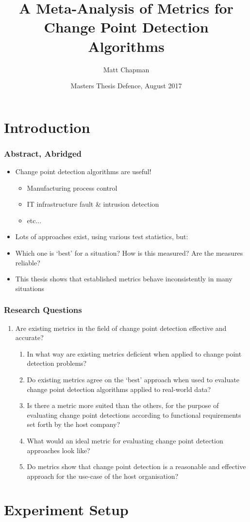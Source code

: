 \documentclass{beamer}
\title[Metrics Meta-Analysis]{A Meta-Analysis of Metrics for Change Point Detection Algorithms}
\author{Matt Chapman}
\institute[UVA]{Universiteit van Amsterdam\\%
    Master Software Engineering%
}
\date[August 2017]{Masters Thesis Defence, August 2017}
\begin{document}
    
\frame{\titlepage}


\section{Introduction}

\begin{frame}
    \frametitle{Abstract, Abridged}
    \begin{itemize}
        \item Change point detection algorithms are useful!
        \begin{itemize}
            \item Manufacturing process control
            \item IT infrastructure fault \& intrusion detection
            \item etc...
        \end{itemize}
        \item Lots of approaches exist, using various test statistics, \alert{but}: \pause
        \item Which one is `best' for a situation? How is this measured? Are the measures reliable?
        \item This thesis shows that established metrics behave \alert{inconsistently} in many situations
    \end{itemize}
\end{frame}

\begin{frame}
    \frametitle{Research Questions}
    
    \begin{enumerate}
        \item Are existing metrics in the field of change point detection effective and accurate?
        \begin{enumerate}
                \item In what way are existing metrics deficient when applied to change point detection problems?
    \item Do existing metrics agree on the `best' approach when used to evaluate change point detection algorithms applied to real-world data?
    \item Is there a metric more suited than the others, for the purpose of evaluating change point detections according to functional requirements set forth by the host company?
    \item What would an ideal metric for evaluating change point detection approaches look like?
    \item Do metrics show that change point detection is a reasonable and effective approach for the use-case of the host organisation?
        \end{enumerate}
    \end{enumerate}    
\end{frame}


\section{Experiment Setup}
    
\begin{frame}

\end{frame}
    
\end{document}
